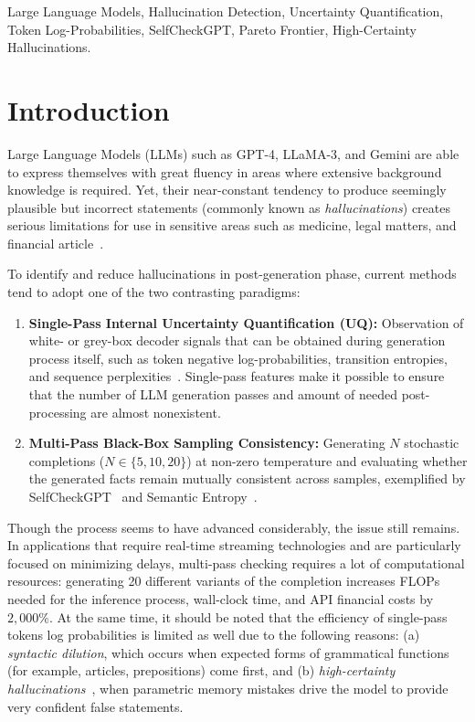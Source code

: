 \documentclass[conference]{IEEEtran}
\begin{document}
\begin{IEEEkeywords}
Large Language Models, Hallucination Detection, Uncertainty Quantification, Token Log-Probabilities, SelfCheckGPT, Pareto Frontier, High-Certainty Hallucinations.
\end{IEEEkeywords}

\section{Introduction}
Large Language Models (LLMs) such as GPT-4, LLaMA-3, and Gemini are able to express themselves with great fluency in areas where extensive background knowledge is required. Yet, their near-constant tendency to produce seemingly plausible but incorrect statements (commonly known as \textit{hallucinations}) creates serious limitations for use in sensitive areas such as medicine, legal matters, and financial article~\cite{ji2023survey, huang2024survey}.

To identify and reduce hallucinations in post-generation phase, current methods tend to adopt one of the two contrasting paradigms:
\begin{enumerate}
    \item \textbf{Single-Pass Internal Uncertainty Quantification (UQ):} Observation of white- or grey-box decoder signals that can be obtained during generation process itself, such as token negative log-probabilities, transition entropies, and sequence perplexities~\cite{rajhans2025token, cole2023selectively, kadavath2022language}. Single-pass features make it possible to ensure that the number of LLM generation passes and amount of needed post-processing are almost nonexistent.
    \item \textbf{Multi-Pass Black-Box Sampling Consistency:} Generating $N$ stochastic completions ($N \in \{5, 10, 20\}$) at non-zero temperature and evaluating whether the generated facts remain mutually consistent across samples, exemplified by SelfCheckGPT~\cite{manakul2023selfcheckgpt} and Semantic Entropy~\cite{kuhn2023semantic, farquhar2024detecting}.
\end{enumerate}

Though the process seems to have advanced considerably, the issue still remains. In applications that require real-time streaming technologies and are particularly focused on minimizing delays, multi-pass checking requires a lot of computational resources: generating 20 different variants of the completion increases FLOPs needed for the inference process, wall-clock time, and API financial costs by $2,000\%$. At the same time, it should be noted that the efficiency of single-pass tokens log probabilities is limited as well due to the following reasons: (a) \textit{syntactic dilution}, which occurs when expected forms of grammatical functions (for example, articles, prepositions) come first, and (b) \textit{high-certainty hallucinations}~\cite{simhi2024high}, when parametric memory mistakes drive the model to provide very confident false statements.
\end{document}
